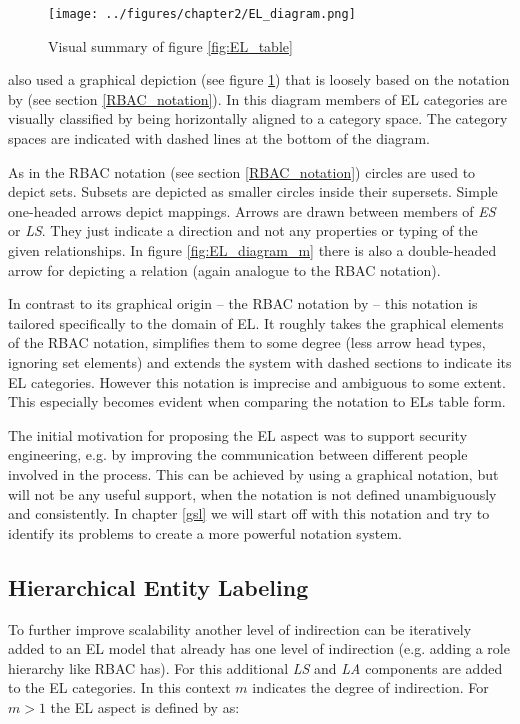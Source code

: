 \documentclass[twoside, openright, 12pt]{book}
\begin{document}
\begin{figure}[htb]
	\centering
	\texttt{[image: ../figures/chapter2/EL\_diagram.png]}
	\caption{Visual summary of figure \ref{fig:EL_table} \cite[p.76, figure 4.3]{Amthor18}}
	\label{fig:EL_diagram}
\end{figure}

\cite{Amthor18} also used a graphical depiction (see figure \ref{fig:EL_diagram}) that is loosely based on the notation by \cite{Sandhu96} (see section \ref{RBAC_notation}).
In this diagram members of EL categories are visually classified by being horizontally aligned to a category space.
The category spaces are indicated with dashed lines at the bottom of the diagram.

As in the RBAC notation (see section \ref{RBAC_notation}) circles are used to depict sets.
Subsets are depicted as smaller circles inside their supersets.
Simple one-headed arrows depict mappings.
Arrows are drawn between members of \textit{ES} or \textit{LS}.
They just indicate a direction and not any properties or typing of the given relationships.
In figure \ref{fig:EL_diagram_m} there is also a double-headed arrow for depicting a relation (again analogue to the RBAC notation).

In contrast to its graphical origin -- the RBAC notation by \cite{Sandhu96} -- this notation is tailored specifically to the domain of EL.
It roughly takes the graphical elements of the RBAC notation, simplifies them to some degree (less arrow head types, ignoring set elements) and extends the system with dashed sections to indicate its EL categories.
However this notation is imprecise and ambiguous to some extent.
This especially becomes evident when comparing the notation to ELs table form.

The initial motivation for proposing the EL aspect was to support security engineering, e.g. by improving the communication between different people involved in the process.
This can be achieved by using a graphical notation, but will not be any useful support, when the notation is not defined unambiguously and consistently.
In chapter \ref{gsl} we will start off with this notation and try to identify its problems to create a more powerful notation system.

\subsection{Hierarchical Entity Labeling}
\label{HEL}
To further improve scalability another level of indirection can be iteratively added to an EL model that already has one level of indirection (e.g. adding a role hierarchy like RBAC has).
For this additional \textit{LS} and \textit{LA} components are added to the EL categories.
In this context $m$ indicates the degree of indirection.
For $m>1$ the EL aspect is defined by \cite{Amthor18} as:
\end{document}
